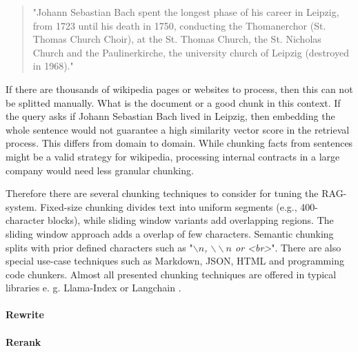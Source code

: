 \begin{quote}
    "Johann Sebastian Bach spent the longest phase of his career in Leipzig, from 1723 until his death in 1750, conducting the Thomanerchor (St. Thomas Church Choir), at the St. Thomas Church, the St. Nicholas Church and the Paulinerkirche, the university church of Leipzig (destroyed in 1968)."
\end{quote}

If there are thousands of wikipedia pages or websites to process, then this can not be splitted manually. What is the document or a good chunk in this context. If the query asks if Johann Sebastian Bach lived in Leipzig, then embedding the whole sentence would not guarantee a high similarity vector score in the retrieval process. This differs from domain to domain. While chunking facts from sentences might be a valid strategy for wikipedia, processing internal contracts in a large company would need less granular chunking. 

Therefore there are several chunking techniques to consider for tuning the RAG-system. Fixed-size chunking divides text into uniform segments (e.g., 400-character blocks), while sliding window variants add overlapping regions. The sliding window approach adds a overlap of few characters. Semantic chunking splits with prior defined characters such as "\textit{$\backslash n$, $\backslash\backslash n$ or <br>}". There are also special use-case techniques such as Markdown, JSON, HTML and programming code chunkers. Almost all presented chunking techniques are offered in typical libraries e. g. Llama-Index \cite{Liu_LlamaIndex_2022} or Langchain \cite{Chase_LangChain_2022}.



\paragraph{Rewrite}
\label{sec:rewrite}

\paragraph{Rerank}
\label{sec:rerank}

